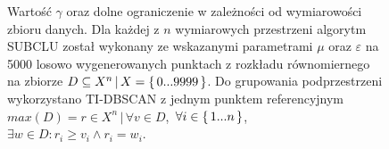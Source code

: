 \begin{figure}
	\centering
	\caption{Wartość $ \gamma $ oraz dolne ograniczenie w zależności od wymiarowości zbioru danych. Dla każdej z $ n $ wymiarowych przestrzeni algorytm SUBCLU został wykonany ze wskazanymi parametrami $ \mu $ oraz $ \varepsilon $ na 5000 losowo wygenerowanych punktach z rozkładu równomiernego na zbiorze \mbox{$ D \subseteq X^n \,|\, X = \set{ 0...9999 } $}. Do grupowania podprzestrzeni wykorzystano TI-DBSCAN \cite{tidbscan} z jednym punktem referencyjnym \mbox{$ max(D) = r \in X^n \,|\, \forall v \in D$, $\forall i \in \set{1...n}$, $\exists w \in D : r_i \ge v_i \land r_i = w_i$.}}
	\label{fig:odc:subclu-gamma-of-n}
\end{figure}